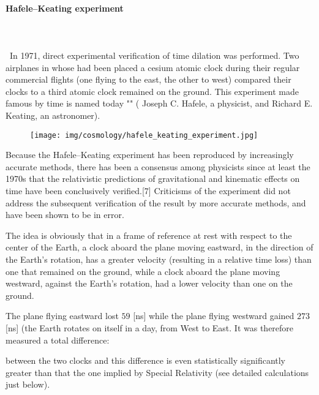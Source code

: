 	\paragraph{Hafele–Keating experiment}\mbox{}\\\\\
	In 1971, direct experimental verification of time dilation was performed. Two airplanes in whose had been placed a cesium atomic clock during their regular commercial flights (one flying to the east, the other to west) compared their clocks to a third  atomic clock remained on the ground. This experiment made famous by time is named today "" ( Joseph C. Hafele, a physicist, and Richard E. Keating, an astronomer).
	\begin{figure}[H]
		\begin{center}
		\texttt{[image: img/cosmology/hafele\_keating\_experiment.jpg]}
		\end{center}
	\end{figure}
	Because the Hafele–Keating experiment has been reproduced by increasingly accurate methods, there has been a consensus among physicists since at least the 1970s that the relativistic predictions of gravitational and kinematic effects on time have been conclusively verified.[7] Criticisms of the experiment did not address the subsequent verification of the result by more accurate methods, and have been shown to be in error.

	The idea is obviously that in a frame of reference at rest with respect to the center of the Earth, a clock aboard the plane moving eastward, in the direction of the Earth's rotation, has a greater velocity (resulting in a relative time loss) than one that remained on the ground, while a clock aboard the plane moving westward, against the Earth's rotation, had a lower velocity than one on the ground.
	
	The plane flying eastward lost $59$ [ns] while the plane flying westward gained $273$ [ns] (the Earth rotates on itself in a day, from West to East. It was therefore measured a total difference:
	
	between the two clocks and this difference is even statistically significantly greater than that the one implied by Special Relativity (see detailed calculations just below).

